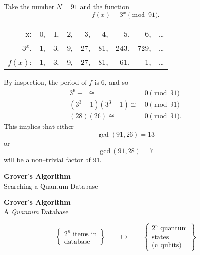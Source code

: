 \documentclass{slides}
\begin{document}
Take the number $N=91$ and the function
\begin{equation*}
f(x) = 3^x\pmod{91}.
\end{equation*}
\begin{flushleft}
\begin{tabular}{rrrrrrrrl}
x:& 0,& 1,& 2,& 3,& 4,& 5,& 6,& \dots\\
$3^x$:& 1,& 3,& 9,& 27,& 81,& 243,& 729,& \dots\\
$f(x)$:& 1,& 3,& 9,& 27,& 81,& 61,& 1,& \dots
\end{tabular}
\end{flushleft}
By inspection, the period of $f$ is 6, and so 
\begin{equation*}
\begin{split}
3^6- 1\cong&\ 0 \pmod{91}\\
\left(3^3+1\right)
\left(3^3-1\right)
\cong&\ 0 \pmod{91}\\
(28)(26)\cong&\ 0\pmod{91}.
\end{split}
\end{equation*}
This implies that either
\begin{equation*}
\gcd\left(91,26\right) = 13
\end{equation*}
or
\begin{equation*}
\gcd\left(91,28\right) = 7
\end{equation*}
will be a non--trivial factor of 91.


\pagebreak


\begin{center}
\textbf{Grover's Algorithm}\\
\bigskip
Searching a Quantum Database
\end{center}

\pagebreak

\begin{center}
\textbf{Grover's Algorithm}\\
\bigskip
A \emph{Quantum} Database
\end{center}

\begin{equation*}
\left\lbrace
    \begin{matrix}
    \text{$2^n$ items in}\\
    \text{database}
    \end{matrix}
\right\rbrace
\qquad\mapsto\qquad
\left\lbrace
    \begin{matrix}
    \text{$2^n$ quantum}\\
    \text{states}\\
    \text{($n$ qubits)}
    \end{matrix}
\right\rbrace
\end{equation*}
\end{document}
